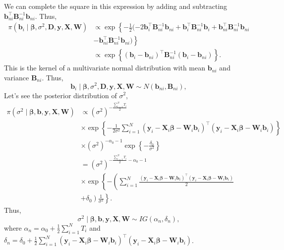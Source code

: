 We can complete the square in this expression by adding and subtracting $\bm{b}_{ni}^{\top}\bm{B}_{ni}^{-1}\bm{b}_{ni}$. Thus,
\begin{align*}
	\pi(\bm{b}_i\mid \bm{\beta},\sigma^2,\bm{D},\bm{y}, \bm{X}, \bm{W})&\propto \exp\left\{-\frac{1}{2}(-2\bm{b}_i^{\top}\bm{B}_{ni}^{-1}\bm{b}_{ni}+ \bm{b}_i^{\top}\bm{B}_{ni}^{-1}\bm{b}_i+\bm{b}_{ni}^{\top}\bm{B}_{ni}^{-1}\bm{b}_{ni}\right.\\
	&\left.-\bm{b}_{ni}^{\top}\bm{B}_{ni}^{-1}\bm{b}_{ni})\right\}\\
	&\propto \exp\left\{(\bm{b}_i-\bm{b}_{ni})^{\top}\bm{B}_{ni}^{-1}(\bm{b}_i-\bm{b}_{ni})\right\}. 
\end{align*}
This is the kernel of a multivariate normal distribution with mean $\bm{b}_{ni}$ and variance $\bm{B}_{ni}$. Thus,
\begin{equation*}
	\bm{b}_i\mid \bm{\beta},\sigma^2,\bm{D},\bm{y}, \bm{X}, \bm{W} \sim {N}(\bm{b}_{ni},\bm{B}_{ni}), 
\end{equation*} 
Let's see the posterior distribution of $\sigma^2$,
\begin{align*}
	\pi(\sigma^2\mid \bm{\beta},\bm{b},\bm{y}, \bm{X}, \bm{W})&\propto (\sigma^2)^{-\frac{\sum_{i=1}^N T_i}{2}}\\
	&\times\exp\left\{-\frac{1}{2\sigma^2}\sum_{i=1}^N(\bm{y}_i-\bm{X}_i\bm{\beta}-\bm{W}_i\bm{b}_i)^{\top}(\bm{y}_i-\bm{X}_i\bm{\beta}-\bm{W}_i\bm{b}_i)\right\}\\
	&\times (\sigma^2)^{-\alpha_0-1}\exp\left\{-\frac{\delta_0}{\sigma^2}\right\}\\
	&=(\sigma^2)^{-\frac{\sum_{i=1}^N T_i}{2}-\alpha_0-1}\\
	&\times \exp\left\{-\left(\sum_{i=1}^N\frac{(\bm{y}_i-\bm{X}_i\bm{\beta}-\bm{W}_i\bm{b}_i)^{\top}(\bm{y}_i-\bm{X}_i\bm{\beta}-\bm{W}_i\bm{b}_i)}{2}\right.\right.\\
	&\left.\left.+\delta_0\right)\frac{1}{\sigma^2}\right\}. 
\end{align*}
Thus,
\begin{equation*}
	\sigma^2\mid  \bm{\beta}, \bm{b}, \bm{y}, \bm{X}, \bm{W} \sim {I}{G}(\alpha_n, \delta_n),
\end{equation*}
where $\alpha_n=\alpha_0+\frac{1}{2}\sum_{i=1}^N T_i$ and $\delta_n=\delta_0+\frac{1}{2}\sum_{i=1}^N(\bm{y}_i-\bm{X}_i\bm{\beta}-\bm{W}_i\bm{b}_i)^{\top}(\bm{y}_i-\bm{X}_i\bm{\beta}-\bm{W}_i\bm{b}_i)$.

